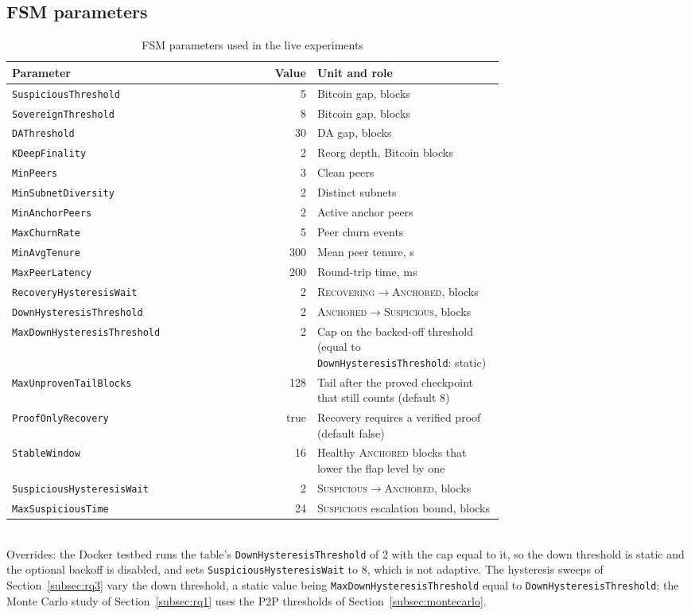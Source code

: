 \subsection*{FSM parameters}

\begin{table}[H]
\caption{FSM parameters used in the live experiments}
\label{tab:fsm-params}
\centering
\footnotesize
\begin{tabular}{@{}p{0.34\linewidth}rp{0.38\linewidth}@{}}
\toprule
\textbf{Parameter} & \textbf{Value} & \textbf{Unit and role} \\
\midrule
\texttt{SuspiciousThreshold} & 5 & Bitcoin gap, blocks \\
\texttt{SovereignThreshold} & 8 & Bitcoin gap, blocks \\
\texttt{DAThreshold} & 30 & DA gap, blocks \\
\texttt{KDeepFinality} & 2 & Reorg depth, Bitcoin blocks \\
\texttt{MinPeers} & 3 & Clean peers \\
\texttt{MinSubnetDiversity} & 2 & Distinct subnets \\
\texttt{MinAnchorPeers} & 2 & Active anchor peers \\
\texttt{MaxChurnRate} & 5 & Peer churn events \\
\texttt{MinAvgTenure} & 300 & Mean peer tenure, s \\
\texttt{MaxPeerLatency} & 200 & Round-trip time, ms \\
\texttt{RecoveryHysteresisWait} & 2 & \textsc{Recovering}$\to$\textsc{Anchored}, blocks \\
\texttt{DownHysteresisThreshold} & 2 & \textsc{Anchored}$\to$\textsc{Suspicious}, blocks \\
\texttt{MaxDownHysteresisThreshold} & 2 & Cap on the backed-off threshold (equal to \texttt{DownHysteresisThreshold}: static) \\
\texttt{MaxUnprovenTailBlocks} & 128 & Tail after the proved checkpoint that still counts (default 8) \\
\texttt{ProofOnlyRecovery} & true & Recovery requires a verified proof (default false) \\
\texttt{StableWindow} & 16 & Healthy \textsc{Anchored} blocks that lower the flap level by one \\
\texttt{SuspiciousHysteresisWait} & 2 & \textsc{Suspicious}$\to$\textsc{Anchored}, blocks \\
\texttt{MaxSuspiciousTime} & 24 & \textsc{Suspicious} escalation bound, blocks \\
\bottomrule
\end{tabular}
\\[2pt]
\footnotesize Overrides: the Docker testbed runs the table's
\texttt{DownHysteresisThreshold} of 2 with the cap equal to it, so the down threshold
is static and the optional backoff is disabled, and sets \texttt{SuspiciousHysteresisWait} to 8, which
is not adaptive. The hysteresis sweeps of Section~\ref{subsec:rq3}
vary the down threshold, a static value being \texttt{MaxDownHysteresisThreshold}
equal to \texttt{DownHysteresisThreshold}; the Monte Carlo study of
Section~\ref{subsec:rq1} uses the P2P thresholds of
Section~\ref{subsec:montecarlo}.
\end{table}

